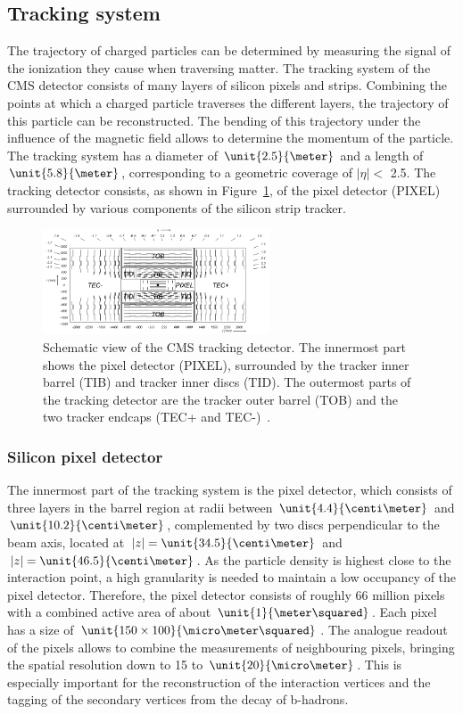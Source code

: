\subsection{Tracking system}
The trajectory of charged particles can be determined by measuring the signal of the ionization they cause when traversing matter. The tracking system of the CMS detector consists of many layers of silicon pixels and strips. Combining the points at which a charged particle traverses the different layers, the trajectory of this particle can be reconstructed. The bending of this trajectory under the influence of the magnetic field allows to determine the momentum of the particle. The tracking system has a diameter of $\unit{2.5}{\meter}$ and a length of $\unit{5.8}{\meter}$, corresponding to a geometric coverage of $\vert \eta \vert < $ 2.5. The tracking detector consists, as shown in Figure~\ref{fig:tracker}, of the pixel detector (PIXEL) surrounded by various components of  the silicon strip tracker. 
\begin{figure}[htbp]
\centering
  \includegraphics[width=0.6\textwidth]{plots/CMS/Tracker.png}
\caption{Schematic view of the CMS tracking detector. The innermost part shows the pixel detector (PIXEL), surrounded by the tracker inner barrel (TIB) and tracker inner discs (TID). The outermost parts of the tracking detector are the tracker outer barrel (TOB) and the two tracker endcaps (TEC+ and TEC-)~\cite{CMS}.}
\label{fig:tracker}
\end{figure} 
\subsubsection*{Silicon pixel detector}
The innermost part of the tracking system is the pixel detector, which consists of three layers in the barrel region at radii between $\unit{4.4}{\centi\meter}$ and $\unit{10.2}{\centi\meter}$, complemented by two discs perpendicular to the beam axis, located at $\vert z \vert = \unit{34.5}{\centi\meter}$ and  $\vert z \vert = \unit{46.5}{\centi\meter}$. As the particle density is highest close to the interaction point, a high granularity is needed to maintain a low occupancy of the pixel detector. Therefore, the pixel detector consists of roughly 66 million pixels with a combined active area of about $\unit{1}{\meter\squared}$. Each pixel has a size of $\unit{150\times100}{\micro\meter\squared}$. The analogue readout of the pixels allows to combine the measurements of neighbouring pixels, bringing the spatial resolution down to 15 to $\unit{20}{\micro\meter}$. This is especially important for the reconstruction of the interaction vertices and the tagging of the secondary vertices from the decay of b-hadrons.
